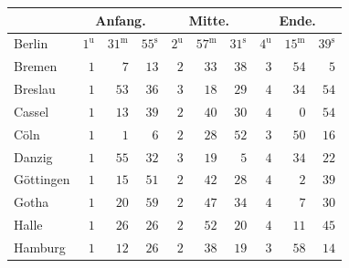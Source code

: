 \begin{center}\small\setlength{\tabcolsep}{3pt}
\begin{tabular}{l|rrr|rrr|rrr}
 &  \multicolumn{3}{c|}{Anfang.}  &  \multicolumn{3}{c|}{Mitte.}  &  \multicolumn{3}{c|}{Ende.}  \\
\hline
Berlin  &  $1^{\mathrm u}$  &  $31^{\mathrm m}$  &  $55^{\mathrm s}$  &  $2^{\mathrm u}$  &  $57^{\mathrm m}$  &  $31^{\mathrm s}$  &  $4^{\mathrm u}$  &  $15^{\mathrm m}$  &  $39^{\mathrm s}$  \\
Bremen  &  $1$  &  $7$  &  $13$  &  $2$  &  $33$  &  $38$  &  $3$  &  $54$  &  $5$  \\
Breslau  &  $1$  &  $53$  &  $36$  &  $3$  &  $18$  &  $29$  &  $4$  &  $34$  &  $54$  \\
Cassel  &  $1$  &  $13$  &  $39$  &  $2$  &  $40$  &  $30$  &  $4$  &  $0$  &  $54$  \\
Cöln  &  $1$  &  $1$  &  $6$  &  $2$  &  $28$  &  $52$  &  $3$  &  $50$  &  $16$  \\
Danzig  &  $1$  &  $55$  &  $32$  &  $3$  &  $19$  &  $5$  &  $4$  &  $34$  &  $22$  \\
Göttingen  &  $1$  &  $15$  &  $51$  &  $2$  &  $42$  &  $28$  &  $4$  &  $2$  &  $39$  \\
Gotha  &  $1$  &  $20$  &  $59$  &  $2$  &  $47$  &  $34$  &  $4$  &  $7$  &  $30$  \\
Halle  &  $1$  &  $26$  &  $26$  &  $2$  &  $52$  &  $20$  &  $4$  &  $11$  &  $45$  \\
Hamburg  &  $1$  &  $12$  &  $26$  &  $2$  &  $38$  &  $19$  &  $3$  &  $58$  &  $14$  \\
\end{tabular}
\end{center}
